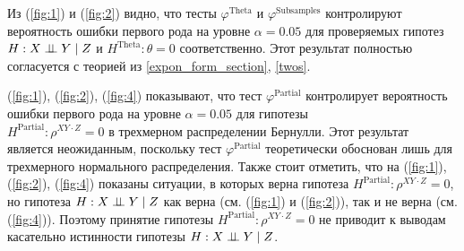 Из (\autoref{fig:1}) и (\autoref{fig:2}) видно, что тесты
$\varphi^{\text{Theta}}$ и $\varphi^{\text{Subsamples}}$ контролируют
вероятность ошибки первого рода 
на уровне
$\alpha=0.05$
для проверяемых гипотез 
$H: X \perp\!\!\!\perp Y \mid Z$ и 
$H^{\text{Theta}}: \theta=0$ соответственно. Этот результат
полностью согласуется с теорией из \autoref{expon_form_section}, 
\autoref{twos}.

(\autoref{fig:1}), (\autoref{fig:2}), (\autoref{fig:4}) показывают,
что тест $\varphi^{\text{Partial}}$ контролирует вероятность
ошибки первого рода на уровне $\alpha=0.05$ для гипотезы\\
$H^\text{Partial}: \rho^{XY\cdot Z}=0$ 
в трехмерном
распределении Бернулли. Этот результат является неожиданным,
поскольку тест $\varphi^{\text{Partial}}$ теоретически обоснован
лишь для трехмерного нормального распределения.
Также стоит отметить, что на (\autoref{fig:1}), (\autoref{fig:2}), (\autoref{fig:4})
показаны ситуации, в которых верна гипотеза $H^\text{Partial}: \rho^{XY\cdot Z}=0$, но
гипотеза $H: X \perp\!\!\!\perp Y \mid Z$ как верна (см.
(\autoref{fig:1}) и (\autoref{fig:2})), так и не верна 
(см. (\autoref{fig:4})). Поэтому принятие
гипотезы $H^\text{Partial}: \rho^{XY\cdot Z}=0$ не приводит
к выводам касательно истинности гипотезы $H: X \perp\!\!\!\perp Y \mid Z$.






